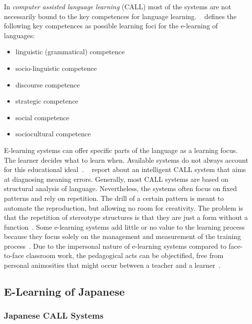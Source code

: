 In \emph{computer assisted language learning} (CALL) most of the systems are not
necessarily bound to the key competences for language learning. 
~\citeyear{Richert2007} defines the following key
competences as possible learning foci for the e-learning of languages:
\begin{itemize}
  \item linguistic (grammatical) competence
  \item socio-linguistic competence
  \item discourse competence
  \item strategic competence
  \item social competence
  \item sociocultural competence
\end{itemize}
E-learning systems can offer specific parts of the language as a 
learning focus. The learner decides what to learn when. Available systems
do not always account for this educational 
ideal~.
~\citeyear{Bailey2009} report about an intelligent 
CALL system that aims at diagnosing meaning errors.
Generally, most CALL systems are based on structural analysis of 
language. Nevertheless, the systems often focus on fixed patterns and rely on 
repetition. The drill of a certain pattern is meant to automate the 
reproduction, but allowing no room for creativity.
The problem is that the repetition of stereotype structures is that they are just
a form without a function~.
Some e-learning systems add little or no value to the learning process
because they focus solely on the management and measurement of the training 
process~. Due to the impersonal nature of
e-learning systems compared to face-to-face classroom work, the pedagogical
acts can be objectified, free from personal animosities that might occur between
a teacher and a learner~. 
 
\subsection{E-Learning of Japanese}
\label{sec:elearn:elearningofjapanese}

\subsubsection{Japanese CALL Systems}
\label{sec:elearn:japanesecallsystems}

